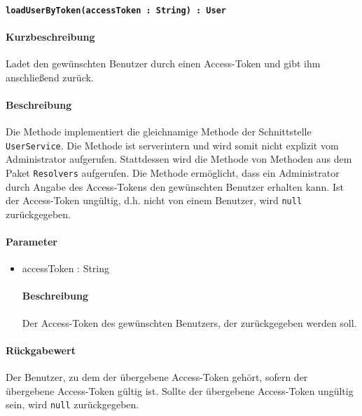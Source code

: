 \paragraph{\texttt{loadUserByToken(accessToken : String) : User}}%
\paragraph*{Kurzbeschreibung}
Ladet den gewünschten Benutzer durch einen Access-Token und gibt ihm anschließend zurück.
\paragraph*{Beschreibung}
Die Methode implementiert die gleichnamige Methode der Schnittstelle \texttt{UserService}.
Die Methode ist serverintern und wird somit nicht explizit vom Administrator aufgerufen.
Stattdessen wird die Methode von Methoden aus dem Paket \texttt{Resolvers} aufgerufen.
Die Methode ermöglicht, dass ein Administrator durch Angabe des Access-Tokens den gewünschten Benutzer erhalten kann. 
Ist der Access-Token ungültig, d.h. nicht von einem Benutzer, wird \texttt{null} zurückgegeben.
\paragraph*{Parameter}
\begin{itemize}
    \item accessToken : String
    		\paragraph*{Beschreibung}
    		Der Access-Token des gewünschten Benutzers, der zurückgegeben werden soll.
\end{itemize}
\paragraph*{Rückgabewert}
Der Benutzer, zu dem der übergebene Access-Token gehört, sofern der übergebene Access-Token gültig ist.
Sollte der übergebene Access-Token ungültig sein, wird \texttt{null} zurückgegeben.
